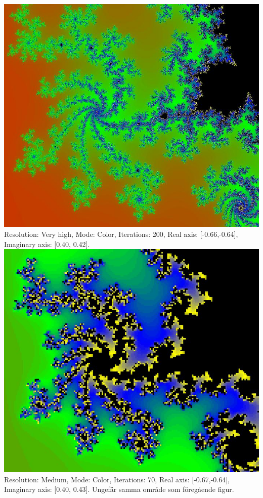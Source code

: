 \documentclass[a4paper]{article}
\begin{document}
\begin{center}
\includegraphics[scale=0.29]{mandelbrot_print_2.jpg}
\newline
Resolution: Very high, Mode: Color, Iterations: 200, Real axis: [-0.66,-0.64], Imaginary axis: [0.40, 0.42].
\newline
\newline
\includegraphics[scale=0.29]{mandelbrot_print_3.jpg}
\newline
Resolution: Medium, Mode: Color, Iterations: 70, Real axis: [-0.67,-0.64], Imaginary axis: [0.40, 0.43]. Ungefär samma område som föregående figur.
\end{center}
\end{document}
